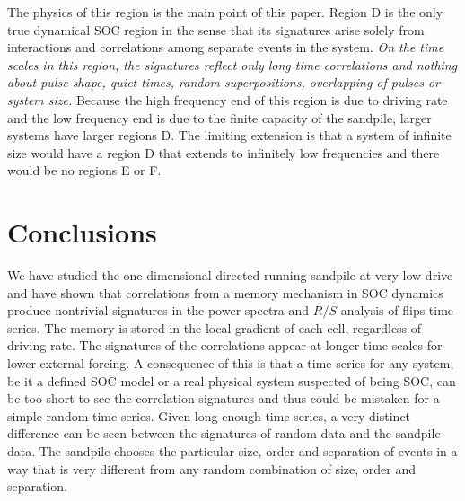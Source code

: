 The physics of this region is the main point of this paper.  Region D
is the only true dynamical SOC region in the sense that its signatures
arise solely from interactions and correlations among separate events
in the system.  {\em On the time scales in this region, the signatures
  reflect only long time correlations and nothing about pulse shape,
  quiet times, random superpositions, overlapping of pulses or system
  size.}  Because the high frequency end of this region is due to
driving rate and the low frequency end is due to the finite capacity
of the sandpile, larger systems have larger regions D.  The limiting
extension is that a system of infinite size would have a region D that
extends to infinitely low frequencies and there would be no regions E
or F.

\section{Conclusions}
\label{sec:partI_conclusions}

We have studied the one dimensional directed running sandpile at very
low drive and have shown that correlations from a memory mechanism in
SOC dynamics produce nontrivial signatures in the power spectra and
$R/S$ analysis of flips time series.  The memory is stored in the
local gradient of each cell, regardless of driving rate.  The
signatures of the correlations appear at longer time scales for lower
external forcing.  A consequence of this is that a time series for any
system, be it a defined SOC model or a real physical system suspected
of being SOC, can be too short to see the correlation signatures and
thus could be mistaken for a simple random time series.  Given long
enough time series, a very distinct difference can be seen between the
signatures of random data and the sandpile data.  The sandpile chooses
the particular size, order and separation of events in a way that is
very different from any random combination of size, order and
separation.




